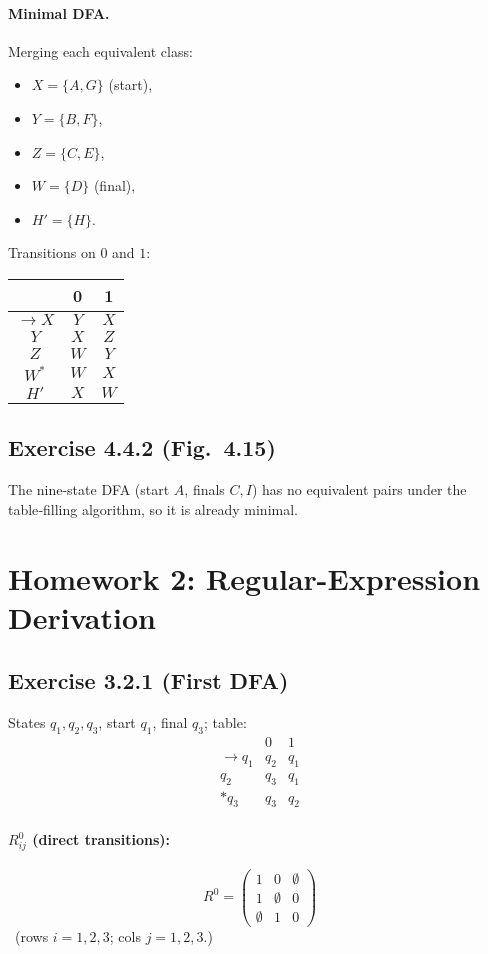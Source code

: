 \documentclass{article}
\begin{document}
\paragraph{Minimal DFA.}  Merging each equivalent class:
\begin{itemize}
  \item $X=\{A,G\}$ (start),
  \item $Y=\{B,F\}$,
  \item $Z=\{C,E\}$,
  \item $W=\{D\}$ (final),
  \item $H'=\{H\}$.
\end{itemize}
Transitions on $0$ and $1$:
\begin{center}\begin{tabular}{c|cc}
       & 0 & 1 \\
\hline
$\to X$ & $Y$ & $X$ \\
$Y$     & $X$ & $Z$ \\
$Z$     & $W$ & $Y$ \\
$W^*$   & $W$ & $X$ \\
$H'$    & $X$ & $W$ \\
\end{tabular}\end{center}

\subsection*{Exercise 4.4.2 (Fig.~4.15)}
The nine-state DFA (start $A$, finals $C,I$) has no equivalent pairs under the
table‑filling algorithm, so it is already minimal.

\section*{Homework 2: Regular-Expression Derivation}
\subsection*{Exercise 3.2.1 (First DFA)}
States $q_1,q_2,q_3$, start $q_1$, final $q_3$; table:
\[\begin{array}{c|cc}
     & 0 & 1 \\
\hline
\to q_1 & q_2 & q_1 \\
 q_2    & q_3 & q_1 \\
\ast q_3& q_3 & q_2
\end{array}\]

\paragraph{$R^0_{ij}$ (direct transitions):}
\[
R^0=\begin{pmatrix}
1 & 0 & \emptyset\\
1 & \emptyset & 0\\
\emptyset & 1 & 0
\end{pmatrix}
\]\
(rows $i=1,2,3$; cols $j=1,2,3$.)
\end{document}
